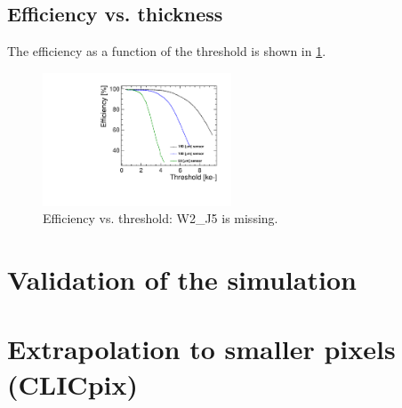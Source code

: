 \subsection{Efficiency vs. thickness}

The efficiency as a function of the threshold is shown in \cref{fig:efficiency_VS_Threshold}.

\begin{figure}[htbp] 
  \centering
  \includegraphics[width=0.5\textwidth]{./figures/TestBeam/Efficiency_vs_THL.pdf}
  \caption{Efficiency vs. threshold: W2\_J5 is missing.}
  \label{fig:efficiency_VS_Threshold}
\end{figure}


\section{Validation of the simulation}
\section{Extrapolation to smaller pixels (CLICpix)}

